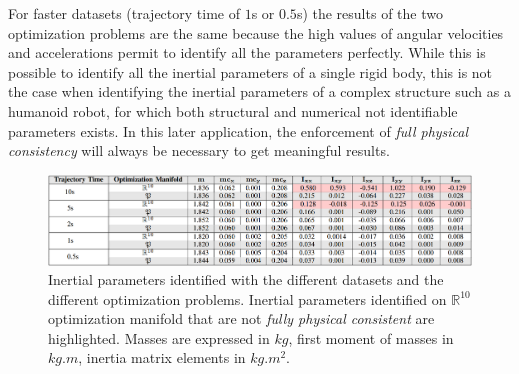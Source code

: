 For faster datasets (trajectory time of $1$s or $0.5$s) the results of the two optimization problems are the same because the high values of angular velocities and accelerations permit to identify all the parameters perfectly.
While this is possible to identify all the inertial parameters of a single rigid body, this is not the case when identifying the inertial parameters of a complex structure such as a humanoid robot, for which both structural \cite{ayusawa2014identifiability} and numerical \cite{pham1991essential} not identifiable parameters exists.
In this later application, the enforcement of \emph{full physical consistency}  will always be necessary to get meaningful results.

\begin{figure}
\centering
  \includegraphics[width=\linewidth]{tableResults.png}
  \caption{Inertial parameters identified with the different datasets and the different optimization problems.
  Inertial parameters identified on $\mathbb{R}^{10}$ optimization manifold that are not \emph{fully physical consistent} are highlighted.
Masses are expressed in $kg$, first moment of masses in $kg.m$, inertia matrix elements in $kg.m^2$.}
\label{table:results}
\end{figure}
